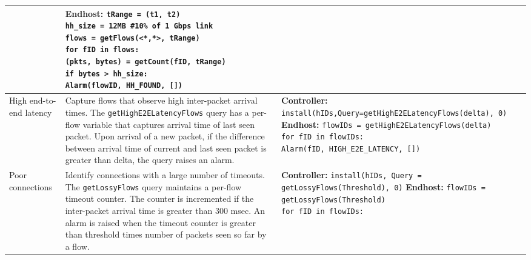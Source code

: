 \begin{table}[!h]
{\begin{tabular}{C{2cm} L{5cm} L{10cm}}
					   & \textbf{Endhost:} \newline
						 \texttt{tRange = (t1, t2) \newline
						 hh\_size = 12MB  \#10\% of 1~Gbps link  \newline
			  			 flows = getFlows(<*,*>, tRange) \newline
			  			 for fID in flows: \newline
			  			 	\hspace{0.3cm} (pkts, bytes) = getCount(fID, tRange) \newline
			  			 	if bytes > hh\_size: \newline
			  			 	\hspace{0.3cm} \hspace{0.3cm} Alarm(flowID, HH\_FOUND, []) 
			  			 	 } \\
\midrule
High end-to-end latency  &  Capture flows that observe high inter-packet arrival times. The  {\tt getHighE2ELatencyFlows} query has a per-flow variable that captures arrival time of last seen packet. Upon arrival of a new packet, if the difference between arrival time of current and last seen packet is greater than delta, the query raises an alarm. 
						  & \textbf{Controller:} \newline
						  	\texttt{install(hIDs,Query=getHighE2ELatencyFlows(delta), 0)} \newline
						  	\textbf{Endhost:} \newline
						  	 \texttt{flowIDs = getHighE2ELatencyFlows(delta) \newline
						  	 for fID in flowIDs: \newline
						  	 \hspace{0.3cm} Alarm(fID, HIGH\_E2E\_LATENCY, []) 
						  	 } \\
\midrule
Poor connections  &  Identify connections with a large number of timeouts. The {\tt getLossyFlows} query maintains a per-flow timeout counter. The counter is incremented if the inter-packet arrival time is greater than 300 msec. An alarm is raised when the timeout counter is greater than threshold times number of packets seen so far by a flow.
						  & \textbf{Controller:} \newline
						  	\texttt{install(hIDs, Query = getLossyFlows(Threshold), 0)} \newline
						  	\textbf{Endhost:} \newline
						  	 \texttt{flowIDs = getLossyFlows(Threshold) \newline
						  	 for fID in flowIDs: \newline
}
\end{tabular}}
\end{table}
